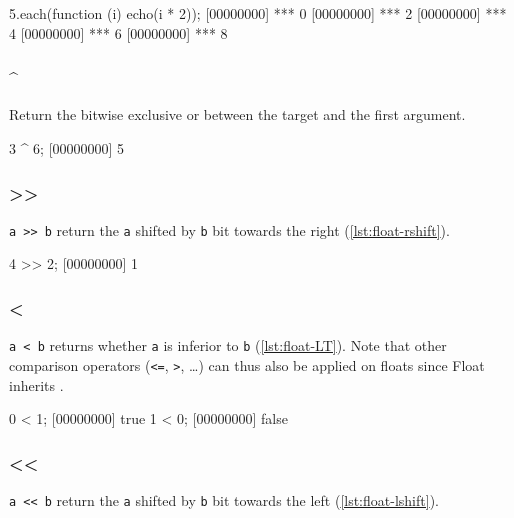 \begin{urbiscript}[caption=Float.each, label=lst:float-each]
5.each(function (i) { echo(i * 2)});
[00000000] *** 0
[00000000] *** 2
[00000000] *** 4
[00000000] *** 6
[00000000] *** 8
\end{urbiscript}

\subsubsection{\^{}}

Return the bitwise exclusive or between the target and the first argument.

\begin{urbiscript}[caption=Float.'\^{}', label=lst:float-bitxor]
3 ^ 6;
[00000000] 5
\end{urbiscript}

\subsubsection{\textgreater\textgreater}

\lstinline|a >> b| return the \lstinline|a| shifted by \lstinline|b|
bit towards the right (\autoref{lst:float-rshift}).

\begin{urbiscript}[caption=Float.'$>>$', label=lst:float-rshift]
4 >> 2;
[00000000] 1
\end{urbiscript}

\subsubsection{\textless}

\lstinline|a < b| returns whether \lstinline|a| is inferior to
\lstinline|b| (\autoref{lst:float-LT}). Note that other comparison operators
(\lstinline|<=|, \lstinline|>|, \ldots) can thus also be applied on
floats since Float inherits .

\begin{urbiscript}[caption=Float.'$<$', label=lst:float-LT]
0 < 1;
[00000000] true
1 < 0;
[00000000] false
\end{urbiscript}

\subsubsection{\textless\textless}

\lstinline|a << b| return the \lstinline|a| shifted by \lstinline|b|
bit towards the left (\autoref{lst:float-lshift}).

